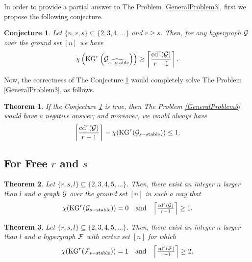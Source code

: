 \documentclass[11pt]{article}
\newtheorem{precon}{{\bf Conjecture}}
\newenvironment{con}{\begin{precon}{\hspace{-0.5
               em}{\bf.\ }}}{\end{precon}}
\newtheorem{prethm}{{\bf Theorem}}
\newenvironment{thm}{\begin{prethm}{\hspace{-0.5
               em}{\bf.\ }}}{\end{prethm}}
\begin{document}
In order to provide a partial answer to The Problem \ref{GeneralProblem3}, first we
propose the following conjecture.

\begin{con} \label{Almost}
	Let $\{n, r, s\} \subseteq \{2, 3, 4, \dots \}$ and $r \geq s$.
	Then, for any hypergraph ${\cal G}$ over the ground set $[n]$ we have
	$$  \chi \left(       {\rm KG}^r \left( {\cal G}_{     \widetilde{{s-  {\rm stable}   }}     } \right)         \right)
	\geq
	\left\lceil  \frac{{\rm cd}^r ({\cal G})}{r-1}   \right\rceil    . $$
\end{con}

Now, the correctness of The Conjecture \ref{Almost} would completely solve The Problem \ref{GeneralProblem3}, as follows. 

\begin{thm} \label{AlmosttoProblem3}
	If the Conjecture \ref{Almost} is true, then The Problem \ref{GeneralProblem3}
	would have a negative answer; and moreover, we would always have
	$$\left\lceil  \frac{{\rm cd}^r ({\cal G})}{r-1}   \right\rceil      -  \chi ({\rm KG}^r ({\cal G}_{s-{\rm stable}})) \leq 1.$$
\end{thm}




\subsection{For Free $r$ and $s$}

\begin{thm} \label{Freers1}
	Let $\{r,s, l\} \subseteq \{2,3,4,5,\dots \}$.
	Then, there exist an integer $n$ larger than $l$ and a graph ${\cal G}$
	over the ground set $[n]$ in such a way that
	$$\begin{array}{ccc}
		\chi ({\rm KG}^r ({\cal G}_{s-{\rm stable}}))=0  &  {\rm and}   &
		\left\lceil  \frac{{\rm cd}^s ({\cal G})}{r-1}   \right\rceil  \geq 1.
	\end{array}$$
\end{thm}

\begin{thm} \label{Freers2}
	Let $\{r,s,l\} \subseteq \{2,3,4,5, \dots \}$.
	Then, there exist an integer $n$ larger than $l$ and a hypergraph ${\cal F}$ with vertex set $[n]$ for which
	$$\begin{array}[1]{ccc}
		\chi ({\rm KG}^r ({\cal F}_{s-{\rm stable}}))=1  &  {\rm and}   &
		\left\lceil  \frac{{\rm cd}^s ({\cal F})}{r-1}   \right\rceil  \geq 2.
	\end{array}  $$
\end{thm}
\end{document}
